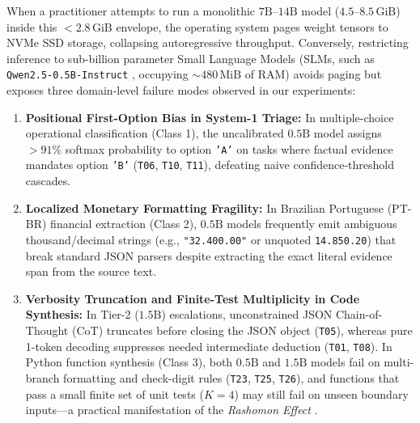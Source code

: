 \documentclass[10pt,a4paper]{article}
\begin{document}
When a practitioner attempts to run a monolithic $7\text{B}\text{--}14\text{B}$ model ($4.5\text{--}8.5\,\text{GiB}$) inside this $<2.8\,\text{GiB}$ envelope, the operating system pages weight tensors to NVMe SSD storage, collapsing autoregressive throughput. Conversely, restricting inference to sub-billion parameter Small Language Models (SLMs, such as \texttt{Qwen2.5-0.5B-Instruct} \cite{qwen2024qwen25}, occupying $\sim 480\,\text{MiB}$ of RAM) avoids paging but exposes three domain-level failure modes observed in our experiments:
\begin{enumerate}
    \item \textbf{Positional First-Option Bias in System-1 Triage:} In multiple-choice operational classification (Class 1), the uncalibrated $0.5\text{B}$ model assigns $>91\%$ softmax probability to option \texttt{'A'} on tasks where factual evidence mandates option \texttt{'B'} (\texttt{T06}, \texttt{T10}, \texttt{T11}), defeating naive confidence-threshold cascades.
    \item \textbf{Localized Monetary Formatting Fragility:} In Brazilian Portuguese (PT-BR) financial extraction (Class 2), $0.5\text{B}$ models frequently emit ambiguous thousand/decimal strings (e.g., \texttt{"32.400.00"} or unquoted \texttt{14.850.20}) that break standard JSON parsers despite extracting the exact literal evidence span from the source text.
    \item \textbf{Verbosity Truncation and Finite-Test Multiplicity in Code Synthesis:} In Tier-2 ($1.5\text{B}$) escalations, unconstrained JSON Chain-of-Thought (CoT) \cite{wei2022cot} truncates before closing the JSON object (\texttt{T05}), whereas pure 1-token decoding suppresses needed intermediate deduction (\texttt{T01}, \texttt{T08}). In Python function synthesis (Class 3), both $0.5\text{B}$ and $1.5\text{B}$ models fail on multi-branch formatting and check-digit rules (\texttt{T23}, \texttt{T25}, \texttt{T26}), and functions that pass a small finite set of unit tests ($K=4$) may still fail on unseen boundary inputs—a practical manifestation of the \emph{Rashomon Effect} \cite{breiman2001statistical,fisher2019rashomon,mlodozeniec2026rashomon}.
\end{enumerate}
\end{document}

